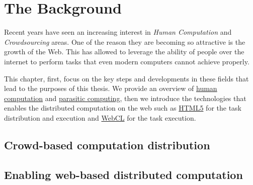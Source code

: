 
\chapter{The Background}
\label{cap:bg}



Recent years have seen an increasing interest in \emph{Human Computation}
and \emph{Crowdsourcing} areas. One of the reason they are becoming
so attractive is the growth of the Web. This has allowed to leverage
the ability of people over the internet to perform tasks that even
modern computers cannot achieve properly.

This chapter, first, focus on the key steps and developments
in these fields that lead to the purposes of this thesis.
We provide an overview of \hyperref[sec:bg:crowd:human]{human computation} and
\hyperref[sec:bg:crowd:parasitic]{parasitic computing}, then we introduce the
technologies that enables the distributed computation on the web such as
{\hyperref[sec:bg:web:html5]{HTML5}} for the task distribution and execution
and {\hyperref[sec:bg:web:webcl]{WebCL}} for the task execution.


\section{Crowd-based computation distribution}
\label{sec:bg:crowd}




\section{Enabling web-based distributed computation}
\label{sec:bg:web}
